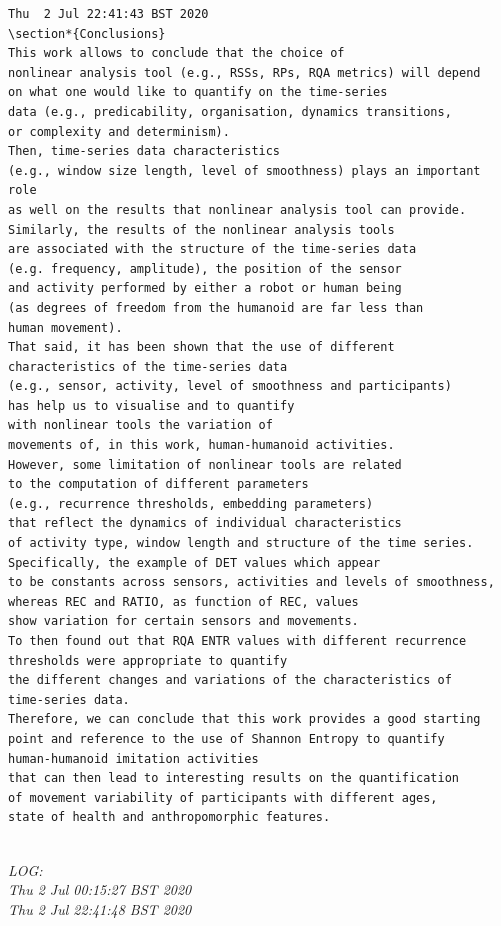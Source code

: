 \documentclass[10pt]{article}
\begin{document}
\begin{enumerate}
\begin{verbatim}
Thu  2 Jul 22:41:43 BST 2020
\section*{Conclusions}
This work allows to conclude that the choice of 
nonlinear analysis tool (e.g., RSSs, RPs, RQA metrics) will depend 
on what one would like to quantify on the time-series 
data (e.g., predicability, organisation, dynamics transitions, 
or complexity and determinism).
Then, time-series data characteristics 
(e.g., window size length, level of smoothness) plays an important role
as well on the results that nonlinear analysis tool can provide.
Similarly, the results of the nonlinear analysis tools
are associated with the structure of the time-series data 
(e.g. frequency, amplitude), the position of the sensor 
and activity performed by either a robot or human being
(as degrees of freedom from the humanoid are far less than
human movement). 
That said, it has been shown that the use of different 
characteristics of the time-series data 
(e.g., sensor, activity, level of smoothness and participants)
has help us to visualise and to quantify 
with nonlinear tools the variation of 
movements of, in this work, human-humanoid activities.
However, some limitation of nonlinear tools are related 
to the computation of different parameters 
(e.g., recurrence thresholds, embedding parameters)
that reflect the dynamics of individual characteristics 
of activity type, window length and structure of the time series.
Specifically, the example of DET values which appear 
to be constants across sensors, activities and levels of smoothness, 
whereas REC and RATIO, as function of REC, values 
show variation for certain sensors and movements. 
To then found out that RQA ENTR values with different recurrence 
thresholds were appropriate to quantify 
the different changes and variations of the characteristics of 
time-series data.
Therefore, we can conclude that this work provides a good starting 
point and reference to the use of Shannon Entropy to quantify 
human-humanoid imitation activities 
that can then lead to interesting results on the quantification 
of movement variability of participants with different ages, 
state of health and anthropomorphic features.


\end{verbatim}

	\textit{
	LOG:\\ 
	Thu  2 Jul 00:15:27 BST 2020 \\
	Thu  2 Jul 22:41:48 BST 2020 \\
	}
	\\




\end{enumerate}
\end{document}
